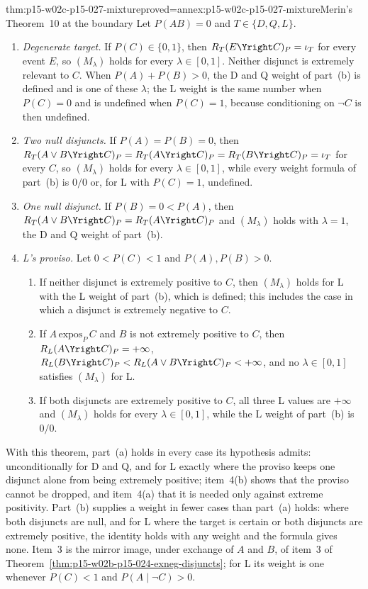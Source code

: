 \begin{hbtheorem}{thm:p15-w02c-p15-027-mixture}{proved=annex:p15-w02c-p15-027-mixture}{Merin's Theorem~10 at the boundary}
Let \(P(AB)=0\) and \(T\in\{D,Q,L\}\).
\begin{enumerate}
\item \emph{Degenerate target.} If \(P(C)\in\{0,1\}\), then
  \(R_T(E\Yright C)_P=\iota_T\) for every event \(E\), so
  \((M_\lambda)\) holds for every \(\lambda\in[0,1]\). Neither disjunct is
  extremely relevant to \(C\). When \(P(A)+P(B)>0\), the D and Q weight
  of part~(b) is defined and is one of these \(\lambda\); the L weight is
  the same number when \(P(C)=0\) and is undefined when \(P(C)=1\),
  because conditioning on \(\neg C\) is then undefined.
\item \emph{Two null disjuncts.} If \(P(A)=P(B)=0\), then
  \(R_T(A\vee B\Yright C)_P=R_T(A\Yright C)_P=R_T(B\Yright C)_P=\iota_T\)
  for every \(C\), so \((M_\lambda)\) holds for every \(\lambda\in[0,1]\),
  while every weight formula of part~(b) is \(0/0\) or, for L with
  \(P(C)=1\), undefined.
\item \emph{One null disjunct.} If \(P(B)=0<P(A)\), then
  \(R_T(A\vee B\Yright C)_P=R_T(A\Yright C)_P\) and \((M_\lambda)\) holds
  with \(\lambda=1\), the D and Q weight of part~(b).
\item \emph{L's proviso.} Let \(0<P(C)<1\) and \(P(A),P(B)>0\).
  \begin{enumerate}
  \item If neither disjunct is extremely positive to \(C\), then
    \((M_\lambda)\) holds for L with the L weight of part~(b), which is
    defined; this includes the case in which a disjunct is extremely
    negative to \(C\).
  \item If \(A\,\mathrm{expos}_P\,C\) and \(B\) is not extremely positive
    to \(C\), then \(R_L(A\Yright C)_P=+\infty\),
    \(R_L(B\Yright C)_P<R_L(A\vee B\Yright C)_P<+\infty\), and no
    \(\lambda\in[0,1]\) satisfies \((M_\lambda)\) for L.
  \item If both disjuncts are extremely positive to \(C\), all three L
    values are \(+\infty\) and \((M_\lambda)\) holds for every
    \(\lambda\in[0,1]\), while the L weight of part~(b) is \(0/0\).
  \end{enumerate}
\end{enumerate}
\end{hbtheorem}

With this theorem, part~(a) holds in every case its hypothesis admits:
unconditionally for D and Q, and for L exactly where the proviso keeps
one disjunct alone from being extremely positive; item~4(b) shows that
the proviso cannot be dropped, and item~4(a) that it is needed only
against extreme positivity. Part~(b) supplies a weight in fewer cases than
part~(a) holds: where both disjuncts are null, and for L where the target
is certain or both disjuncts are extremely positive, the identity holds
with any weight and the formula gives none. Item~3 is the mirror image,
under exchange of \(A\) and \(B\), of item~3 of
Theorem~\ref{thm:p15-w02b-p15-024-exneg-disjuncts}; for L its weight is
one whenever \(P(C)<1\) and \(P(A\mid\neg C)>0\).


